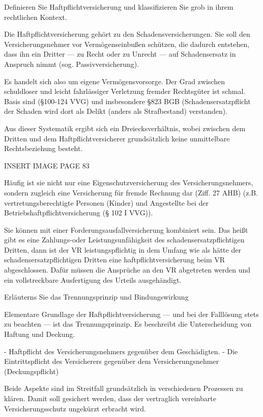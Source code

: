 Definieren Sie Haftpflichtversicherung und klassifizieren
Sie grob in ihrem rechtlichen Kontext.

Die Haftpflichtversicherung gehört zu den Schadensversicherungen. 
Sie soll den Versicherungsnehmer vor Vermögenseinbußen schützen, die dadurch entstehen, 
dass ihn ein Dritter — zu Recht oder zu Unrecht — auf Schadensersatz in Anspruch nimmt (sog. Passivversicherung). 

Es handelt sich also um eigene Vermögensvorsorge. 
Der Grad zwischen schuldloser und leicht fahrlässiger Verletzung fremder Rechtsgüter ist schmal.
Basis sind (§100-124 VVG) und insbesondere 
§823 BGB (Schadensersatzpflicht der Schaden wird dort als Delikt (anders als Strafbestand) verstanden).

Aus dieser Systematik ergibt sich ein Dreiecksverhältnis, 
wobei zwischen dem Dritten und dem Haftpflichtversicherer grundsätzlich keine unmittelbare Rechtsbeziehung besteht. 

INSERT IMAGE PAGE 83

Häufig ist sie nicht nur eine Eigenschutzversicherung des Versicherungsnehmers, sondern zugleich eine Versicherung für fremde Rechnung dar 
(Ziff. 27 AHB) (z.B. vertretungsberechtigte Personen (Kinder) und Angestellte  bei der Betriebshaftpflichtversicherung (§ 102 I VVG)).

Sie können mit einer Forderungsausfallversicherung kombiniert sein. Das heißt gibt es eine Zahlungs-oder Leistungsunfähigkeit
des schadensersatzpflichtigen Dritten, dann ist der VR leistungspflichtig in dem Umfang wie als hätte der schadensersatzpflichtigen Dritten
eine haftpflichtversicherung beim VR abgeschlossen. Dafür müssen die Ansprüche an den VR abgetreten werden und ein vollstreckbare Ausfertigung
des Urteils ausgehändigt.



Erläuterns Sie das Trennungsprinzip und Bindungswirkung

Elementare Grundlage der Haftpflichtversicherung — und bei der Falllösung stets zu beachten — ist das Trennungsprinzip. 
Es beschreibt die Unterscheidung von Haftung und Deckung. 

- Haftpflicht des Versicherungsnehmers gegenüber dem Geschädigten. 
- Die Eintrittspflicht des Versicherers gegenüber dem Versicherungsnehmer (Deckungspflicht)

Beide Aspekte sind im Streitfall grundsätzlich in verschiedenen Prozessen zu klären. 
Damit soll gesichert werden, dass der vertraglich vereinbarte Versicherungsschutz ungekürzt erbracht wird. 

